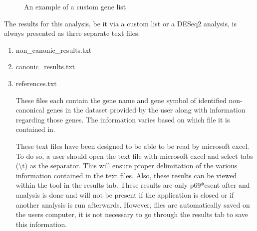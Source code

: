 \documentclass[11pt]{article}
\begin{document}
\begin{figure}[h!]
\centering
{}
\caption{An example of a custom gene list}
\label{fig:custom_gene_list}
\end{figure}

The results for this analysis, be it via a custom list or a DESeq2 analysis, is always presented as three separate text files.
\begin{enumerate}
\item non\_canonic\_results.txt
\item canonic\_results.txt
\item references.txt

These files each contain the gene name and gene symbol of identified non-canonical genes in the dataset provided by the user along with information regarding those genes. The information varies based on which file it is contained in.

These text files have been designed to be able to be read by microsoft excel. To do so, a user should open the text file with microsoft excel and select tabs (\textbackslash t) as the separator. This will ensure proper delimitation of the various information contained in the text files.
Also, these results can be viewed within the tool in the results tab. These results are only p69*esent after and analysis is done and will not be present if the application is closed or if another analysis is run afterwards. However, files are automatically saved on the users computer, it is not necessary to go through the results tab to save this information.
\end{enumerate}
\end{document}
